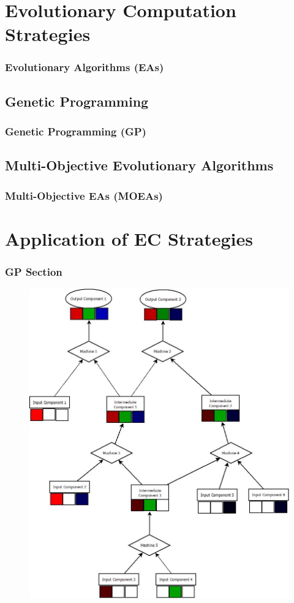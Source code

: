 \documentclass{beamer}
\begin{document}
\section{Evolutionary Computation Strategies}

\begin{frame}
\frametitle{Evolutionary Algorithms (EAs)}

\end{frame}

\subsection{Genetic Programming}

\begin{frame}
\frametitle{Genetic Programming (GP)}

\end{frame}

\subsection{Multi-Objective Evolutionary Algorithms}

\begin{frame}
\frametitle{Multi-Objective EAs (MOEAs)}

\end{frame}

\section{Application of EC Strategies}

\begin{frame}
\frametitle{GP Section}
\begin{figure}
\includegraphics[width=0.5\linewidth]{BaseModel.jpeg}
\end{figure}
\end{frame}
\end{document}
